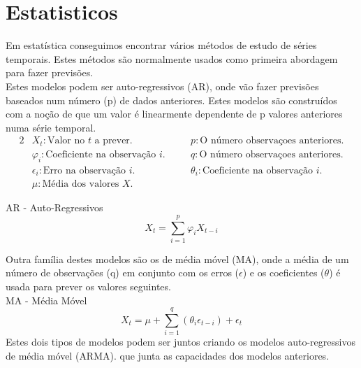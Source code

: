 \section{Estatisticos}

Em estatística conseguimos encontrar vários métodos de estudo de séries temporais. Estes métodos são normalmente usados como primeira abordagem para fazer previsões.\\
Estes modelos podem ser auto-regressivos (\gls{AR}), onde vão fazer previsões baseados num número (p) de dados anteriores. Estes modelos são construídos com a noção de que um valor é linearmente dependente de p valores anteriores numa série temporal.\\

\begin{alignat*}{2} 
    & X_{t} : \text{Valor no } t \text{ a prever.} &\quad& p : \text{O número observaçoes anteriores.} \\
    & \varphi_{i} : \text{Coeficiente na observação } i. &\quad& q : \text{O número observaçoes anteriores.} \\
    & \epsilon_{i} : \text{Erro na observação } i. &\quad& \theta_{i} : \text{Coeficiente na observação } i \text{.} \\ 
    & \mu : \text{Média dos valores } X \text{.} 
\end{alignat*}

\bigskip
\gls{AR} - Auto-Regressivos \\

\begin{equation} \label{eq:ar} 
    X_{t} = \sum_{i=1}^{p}\varphi_{i} X_{t-i} 
\end{equation}
\smallskip

Outra família destes modelos são os de média móvel (\gls{MA}), onde a média de um número de observações (q) em conjunto com os erros ($\epsilon$) e os coeficientes ($\theta$) é usada para prever os valores seguintes.\\
\bigskip
\gls{MA} - Média Móvel \\

\begin{equation} \label{eq:ma} 
    X_{t} = \mu + \sum_{i=1}^{q}(\theta_{i} \epsilon_{t-i}) + \epsilon_{t}
\end{equation}
\smallskip
Estes dois tipos de modelos podem ser juntos criando os modelos auto-regressivos de média móvel (\gls{ARMA}). que junta as capacidades dos modelos anteriores.\\


